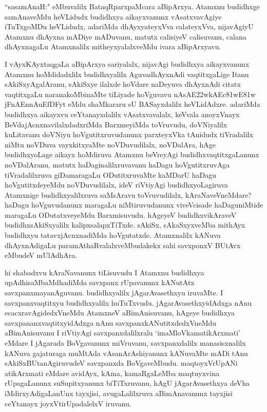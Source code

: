 \begin{artha}
``sasamAnaH:" eMbuvalilx BataqRparxpaMcara aBipArxya. Atamxnu budidhxge samAnaveMdu heVLidudx budidhxya aikayxvanunx vAsatxvavAgiye iTuTxgoMDu heVLidudx, adariMda dhAyxyateyxVva calateyxVva, nijavAgiyU Atamxnu dhAyxna mADiye mADuvanu, matutx calisiyeV calisuvanu, calana dhAyxnagaLu Atamxnalilx mitheyxyalalxveMdu ivara aBipArxyavu.

I vAyxKAyxtaqgaLa aBipArxya sariyalalx, nijavAgi budidhxya aikayxvanunx Atamxnu hoMdidadxlilx budidhxyalilx AguvadhAyxnAdi vaqtitxgaLige Itanu sAkiSxyAgalAranu, sAkiSxye ilalxde hoVdare naDeyuva dhAyxnAdi citatx vaqtitxgaLu naranakoMbinaMte tiLiyade hoVguvavu {\dn nAsAE\322wkAEc\381wE\381w jFnAEnnAuEfDFyt\?} eMdu shaMkararu sU BASayxdalilx heVLidAdxre. adariMda budidhxya aikayxvu ceYtanayxdalilx vAsatxvavalalx, keVvala anoyxVnayx BeVdajAcnxnavilalxdadxriMda BarxmeyiMda toVruvudu, doVNiyalilx kuLitavanu doVNiyu hoVgutitxruvudanunx parxteyxVka tAnidudx tiVradalilx niMtu noVDuva vayxkitxyaMte noVDuvudilalx, noVDalAra, hAge budidhxyoLage aikayx hoMdiruva Atamxnu beVreyAgi budidhxvaqtitxgaLanunx noVDalAranu, matutx haDaginalilxruvavanu haDagu hoVgutitxruvAga tiVradalilxruva giDamaragaLu ODutitxruvaMte kaMDarU haDagu hoVgutitxdeyeMdu noVDuvudilalx, ideV riVtiyAgi budidhxyoLagiruva Atamxnige budidhxyalilxruva saMsAravu toVruvudilalx, kAraNaveVneMdare? haDagu hoVguvudanunx maragaLu niMtiruvudanunx viveVcisade haDaguniMtide maragaLu ODutatxveyeMdu Barxmisuvudu. hAgeyeV budidhxvikAraveV budidhxsAkiSxyalilx kalipxsalapxTiTxde. sAkiSx, sAkaSxyxveMba mithAyx budidhxyu tatavxjAcnxnadiMda hoVgutatxde. Atamxnalilx kANuva dhAyxnAdigaLu paramAthaRvalalxveMbudakekx sahi savxponxV BUtAvx eMbudeV mUlAdhAra. 
\end{artha}


\begin{artha}
hi shabadxvu kAraNavanunx tiLisuvudu I Atamxnu budidhxya upAdhisaMbaMdhadiMda savxpanx rUpavanunx kANutAtx savxpanxmayanAguvanu. budidhxyalilx jAgarAvasethxyu iruvaMte. I savxpanxvaqtitxyu budidhxyalilx huTuTxvudu. jAgarAvasethxyidAdxga nAnu ecacxravAgidedxVneMdu AtamxneV aBimAnisuvanu, hAgeye budidhxya savxpananxvaqtitxyidAdxga nAnu savxpanxkANutitxdedxVneMdu aBimAnisuvanu I riVtiyAgi savxpanxdalilxralu `imaMloVkamatikArxmati' eMdare I jAgarada BoVgavanunx miVruvanu, savxpanxdalilx manasisxnalilx kANuva gajaturaga muMtAda vAsanArAshiyanunx kANuvaMte mADi tAnu sAkiSxBUtanAgiruvudeV savxpanxda BoVgaveMbudu. maqtoyxVrUpANi atikArxmati eMdare avidAyx, kAma, kamaRgaLeMba maqtuyxvina rUpagaLanunx suSupitxyanunx biTiTxruvanu, hAgU jAgarAvasethxya deVha iMdirxyAdigaLanUnx tayxjisi, avugaLalilxruva aBimAnavanunx tayxjisi ceYtanayx joyxVtirUpadalelxV iruvanu.
\end{artha}

